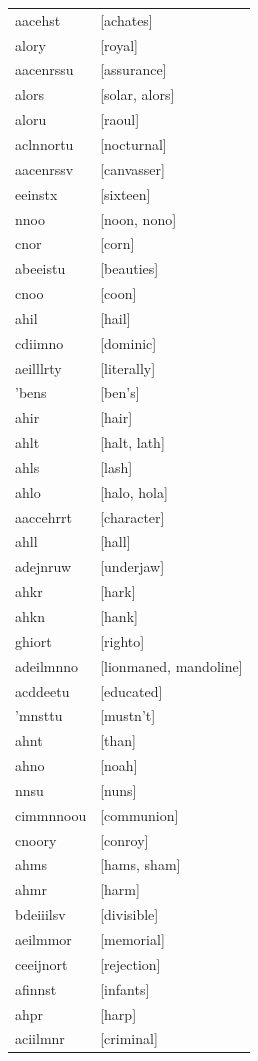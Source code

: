 \documentclass{article}
\begin{document}
\begin{tabular}{ll}
aacehst & [achates] \\
alory & [royal] \\
aacenrssu & [assurance] \\
alors & [solar, alors] \\
aloru & [raoul] \\
aclnnortu & [nocturnal] \\
aacenrssv & [canvasser] \\
eeinstx & [sixteen] \\
nnoo & [noon, nono] \\
cnor & [corn] \\
abeeistu & [beauties] \\
cnoo & [coon] \\
ahil & [hail] \\
cdiimno & [dominic] \\
aeilllrty & [literally] \\
'bens & [ben's] \\
ahir & [hair] \\
ahlt & [halt, lath] \\
ahls & [lash] \\
ahlo & [halo, hola] \\
aaccehrrt & [character] \\
ahll & [hall] \\
adejnruw & [underjaw] \\
ahkr & [hark] \\
ahkn & [hank] \\
ghiort & [righto] \\
adeilmnno & [lionmaned, mandoline] \\
acddeetu & [educated] \\
'mnsttu & [mustn't] \\
ahnt & [than] \\
ahno & [noah] \\
nnsu & [nuns] \\
cimmnnoou & [communion] \\
cnoory & [conroy] \\
ahms & [hams, sham] \\
ahmr & [harm] \\
bdeiiilsv & [divisible] \\
aeilmmor & [memorial] \\
ceeijnort & [rejection] \\
afinnst & [infants] \\
ahpr & [harp] \\
aciilmnr & [criminal] \\

\end{tabular}
\end{document}
